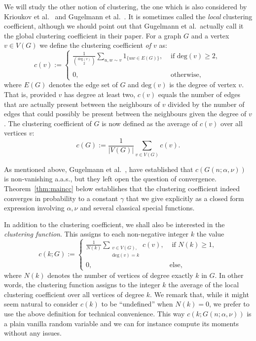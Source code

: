 We will study the other notion of clustering, the one which is also considered by Krioukov et al.~\cite{krioukov2010hyperbolic} and Gugelmann et al.~\cite{gugelmann2012random}. It is sometimes called the {\em local} clustering coefficient, although we should point out that Gugelmann et al.~actually call it the global clustering coefficient in their paper. For a graph $G$ and a vertex $v\in V(G)$ we define the clustering coefficient {\em of $v$} as:
\[
	c(v) := \left\{\begin{array}{cl}
		\displaystyle \frac{1}{\binom{\text{deg}(v)}{2}} \sum_{u,w\sim v} 1_{\{uw \in E(G)\}}, 
			& \text{ if $\text{deg}(v) \geq 2$, }\\
		& \\
        0, & \text{ otherwise,}
        \end{array}\right.
\]
where $E(G)$ denotes the edge set of $G$ and $\text{deg}(v)$ is the degree of vertex $v$. That is, provided $v$ has degree at least two, $c(v)$ equals the number of edges that are actually present between the neighbours of $v$ divided by the number of edges that could possibly be present between the neighbours given the degree of $v$.
The clustering coefficient of $G$ is now defined as the average of $c(v)$ over all vertices $v$:
\[
	c(G) := \frac{1}{|V(G)|} \sum_{v\in V(G)} c(v).
\]

As mentioned above, Gugelmann et al.~\cite{gugelmann2012random}, have established that $c(G(n;\alpha,\nu))$ is non-vanishing a.a.s., but they left open the question of convergence. Theorem~\ref{thm:maincc} below establishes that the clustering coefficient indeed converges in probability to a constant $\gamma$ that we give explicitly as a closed form expression involving $\alpha,\nu$ and several classical special functions.

In addition to the clustering coefficient, we shall also be interested in the {\em clustering function}.
This assigns to each non-negative integer $k$ the value
\begin{equation}\label{eq:def_clustering_function}
	c(k; G) := \begin{cases}
		\displaystyle \frac{1}{N(k)} \sum_{\substack{v \in V(G), \\ \text{deg}(v)=k}}  c(v),  &\mbox{ if } N(k) \ge 1,\\
		0, &\mbox{else,}
	\end{cases}
\end{equation}
where $N(k)$ denotes the number of vertices of degree exactly $k$ in $G$. In other words, the clustering function assigns to the integer $k$ the average of the local clustering coefficient over all vertices of degree $k$. We remark that, while it might seem natural to consider $c(k)$ to be ``undefined'' when $N(k)=0$, we prefer to use the above definition for technical 
convenience.  This way $c(k; G(n;\alpha,\nu) )$ is a plain vanilla random variable and we can for instance compute its moments without any issues.

